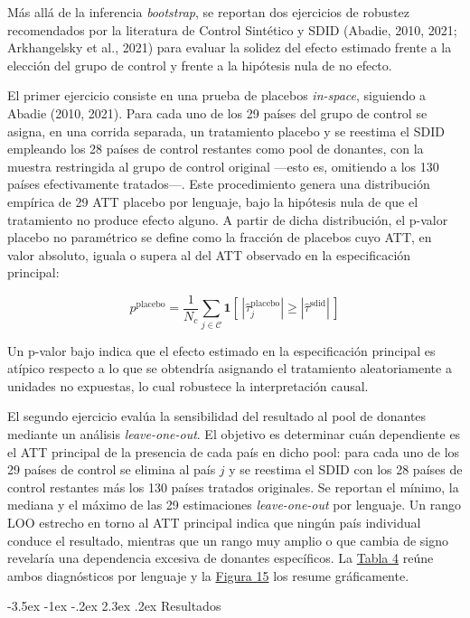 \documentclass[12pt,a4paper]{article}
\makeatletter
\renewcommand\section{\@startsection{section}{1}{\z@}%
  {-3.5ex \@plus -1ex \@minus -.2ex}%
  {2.3ex \@plus.2ex}%
  {\normalfont\normalsize}}
\makeatother
\begin{document}
Más allá de la inferencia \textit{bootstrap}, se reportan dos ejercicios de robustez recomendados por la literatura de Control Sintético y SDID (Abadie, 2010, 2021; Arkhangelsky et al., 2021) para evaluar la solidez del efecto estimado frente a la elección del grupo de control y frente a la hipótesis nula de no efecto.

El primer ejercicio consiste en una prueba de placebos \textit{in-space}, siguiendo a Abadie (2010, 2021). Para cada uno de los 29 países del grupo de control se asigna, en una corrida separada, un tratamiento placebo y se reestima el SDID empleando los 28 países de control restantes como pool de donantes, con la muestra restringida al grupo de control original —esto es, omitiendo a los 130 países efectivamente tratados—. Este procedimiento genera una distribución empírica de 29 ATT placebo por lenguaje, bajo la hipótesis nula de que el tratamiento no produce efecto alguno. A partir de dicha distribución, el p-valor placebo no paramétrico se define como la fracción de placebos cuyo ATT, en valor absoluto, iguala o supera al del ATT observado en la especificación principal:

\[
p^{\text{placebo}} = \frac{1}{N_c}\sum_{j \in \mathcal{C}} \mathbf{1}\!\left[\,|\hat{\tau}_j^{\text{placebo}}| \geq |\hat{\tau}^{\text{sdid}}|\,\right]
\]

Un p-valor bajo indica que el efecto estimado en la especificación principal es atípico respecto a lo que se obtendría asignando el tratamiento aleatoriamente a unidades no expuestas, lo cual robustece la interpretación causal.

El segundo ejercicio evalúa la sensibilidad del resultado al pool de donantes mediante un análisis \textit{leave-one-out}. El objetivo es determinar cuán dependiente es el ATT principal de la presencia de cada país en dicho pool: para cada uno de los 29 países de control se elimina al país $j$ y se reestima el SDID con los 28 países de control restantes más los 130 países tratados originales. Se reportan el mínimo, la mediana y el máximo de las 29 estimaciones \textit{leave-one-out} por lenguaje. Un rango LOO estrecho en torno al ATT principal indica que ningún país individual conduce el resultado, mientras que un rango muy amplio o que cambia de signo revelaría una dependencia excesiva de donantes específicos. La \hyperref[tab:tabla6]{Tabla 4} reúne ambos diagnósticos por lenguaje y la \hyperref[fig:figura15]{Figura 15} los resume gráficamente.

\clearpage
\section{Resultados}
\end{document}
